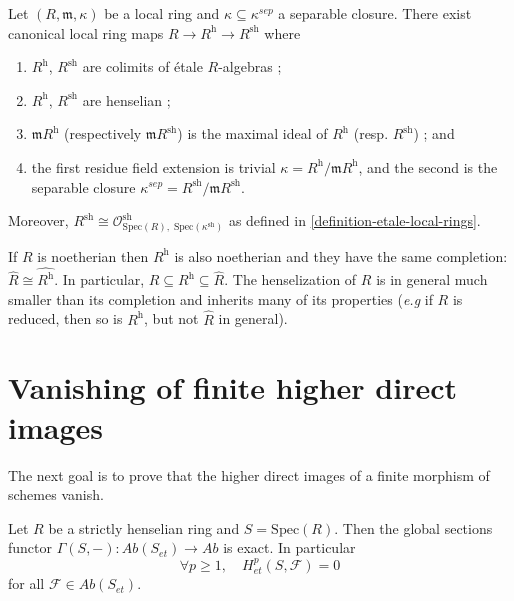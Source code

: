 \begin{theorem}
\label{theorem-henselization}
Let $(R, \mathfrak m, \kappa)$ be a local ring and
$\kappa\subseteq\kappa^{sep}$ a separable closure. There exist canonical local
ring maps $ R\to R^\text{h} \to R^\text{sh}$ where
\begin{enumerate}
\item $R^\text{h}$, $R^\text{sh}$ are colimits of \'etale $R$-algebras ;
\item $R^\text{h}$, $R^\text{sh}$ are henselian ;
\item $\mathfrak m R^\text{h}$ (respectively $\mathfrak m R^\text{sh}$) is the
maximal ideal of $R^\text{h}$ (resp. $R^\text{sh}$) ; and
\item the first residue field extension is trivial $\kappa=R^\text{h}/\mathfrak
m R^\text{h}$, and the second is the separable closure $\kappa^{sep} =
R^\text{sh}/\mathfrak m R^\text{sh}$.
\end{enumerate}
Moreover,
$R^\text{sh} \cong \mathcal{O}^\text{sh}_{\text{Spec}(R), \;
\text{Spec}(\kappa^\text{sh})}$
as defined in \ref{definition-etale-local-rings}.
\end{theorem}

\begin{remark}
\label{remark-henselization-Noetherian}
If $R$ is noetherian then $R^\text{h}$ is also noetherian and they have the
same completion: $\hat R\cong \widehat{R^\text{h}}$. In particular, $R\subseteq
R^\text{h} \subseteq \hat R$. The henselization of $R$ is in general much
smaller than its completion and inherits many of its properties ({\it e.g} if
$R$ is reduced, then so is $R^\text{h}$, but not $\hat R$ in general).
\end{remark}




\section{Vanishing of finite higher direct images}
\label{section-vanishing-finite-morphism}

\noindent
The next goal is to prove that the higher direct images of a finite morphism of
schemes vanish.

\begin{lemma}
\label{lemma-vanishing-etale-cohomology-strictly-henselian}
Let $R$ be a strictly henselian ring and $S=\text{Spec}(R)$. Then the global
sections functor $\Gamma(S, -): \textit{Ab}(S_{et})\to \textit{Ab}$ is exact. In
particular
$$
\forall p\geq 1, \quad H_{et}^p(S, \mathcal{F})=0
$$
for all $\mathcal{F}\in \textit{Ab}(S_{et})$.
\end{lemma}

